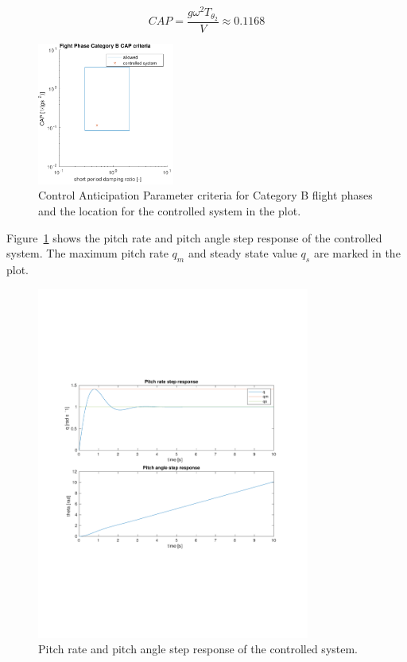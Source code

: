 \begin{equation}
    CAP=\frac{g\omega^2T_{\theta_2}}{V} \approx 0.1168
\end{equation}

\begin{figure}[ht]
    \centering
    \includegraphics[width=0.4\textwidth]{figures/pc_cap.pdf}    
    \caption{Control Anticipation Parameter criteria for Category B flight phases and the location for the controlled system in the plot.}
    \label{fig:pc_cap}
\end{figure}

Figure~\ref{fig:pc_cap} shows the pitch rate and pitch angle step response of the controlled system. The maximum pitch rate $q_m$ and steady state value $q_s$ are marked in the plot. 
\begin{figure}[ht]
    \centering
    \includegraphics[width=0.8\textwidth]{figures/pc_pitch_resp.pdf}    
    \caption{Pitch rate and pitch angle step response of the controlled system.}
    \label{fig:pc_pitch_resp}
\end{figure}



